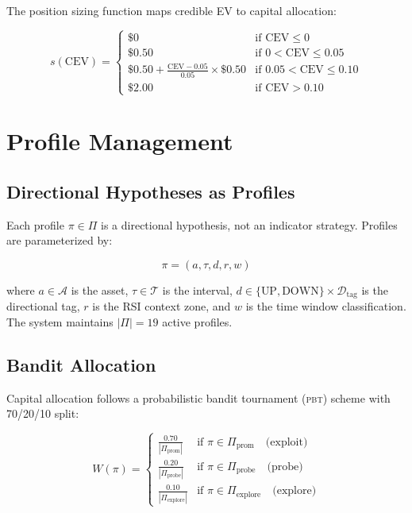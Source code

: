 \documentclass[11pt,a4paper]{article}
\newcommand{\pbt}{\textsc{pbt}}
\begin{document}
The position sizing function maps credible EV to capital allocation:

\begin{equation}\label{eq:position_sizing}
    s(\text{CEV}) = \begin{cases}
        \$0 & \text{if } \text{CEV} \leq 0 \\
        \$0.50 & \text{if } 0 < \text{CEV} \leq 0.05 \\
        \$0.50 + \frac{\text{CEV} - 0.05}{0.05} \times \$0.50 & \text{if } 0.05 < \text{CEV} \leq 0.10 \\
        \$2.00 & \text{if } \text{CEV} > 0.10
    \end{cases}
\end{equation}

\section{Profile Management}\label{sec:profiles}

\subsection{Directional Hypotheses as Profiles}

Each profile $\pi \in \Pi$ is a directional hypothesis, not an indicator strategy. Profiles are parameterized by:

\begin{equation}\label{eq:profile}
    \pi = (a, \tau, d, r, w)
\end{equation}

\noindent where $a \in \mathcal{A}$ is the asset, $\tau \in \mathcal{T}$ is the interval, $d \in \{\text{UP}, \text{DOWN}\} \times \mathcal{D}_{\text{tag}}$ is the directional tag, $r$ is the RSI context zone, and $w$ is the time window classification. The system maintains $|\Pi| = 19$ active profiles.

\subsection{Bandit Allocation}

Capital allocation follows a probabilistic bandit tournament (\pbt) scheme with 70/20/10 split:

\begin{equation}\label{eq:allocation}
    W(\pi) = \begin{cases}
        \frac{0.70}{|\Pi_{\text{prom}}|} & \text{if } \pi \in \Pi_{\text{prom}} \quad \text{(exploit)} \\
        \frac{0.20}{|\Pi_{\text{probe}}|} & \text{if } \pi \in \Pi_{\text{probe}} \quad \text{(probe)} \\
        \frac{0.10}{|\Pi_{\text{explore}}|} & \text{if } \pi \in \Pi_{\text{explore}} \quad \text{(explore)}
    \end{cases}
\end{equation}
\end{document}

